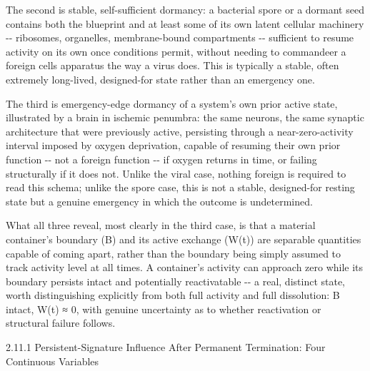 \documentclass[
]{article}
\begin{document}
The second is stable, self-sufficient dormancy: a bacterial spore or a
dormant seed contains both the blueprint and at least some of its own
latent cellular machinery -\/- ribosomes, organelles, membrane-bound
compartments -\/- sufficient to resume activity on its own once
conditions permit, without needing to commandeer a foreign cells
apparatus the way a virus does. This is typically a stable, often
extremely long-lived, designed-for state rather than an emergency one.

The third is emergency-edge dormancy of a system's own prior active
state, illustrated by a brain in ischemic penumbra: the same neurons,
the same synaptic architecture that were previously active, persisting
through a near-zero-activity interval imposed by oxygen deprivation,
capable of resuming their own prior function -\/- not a foreign function
-\/- if oxygen returns in time, or failing structurally if it does not.
Unlike the viral case, nothing foreign is required to read this schema;
unlike the spore case, this is not a stable, designed-for resting state
but a genuine emergency in which the outcome is undetermined.

What all three reveal, most clearly in the third case, is that a
material container's boundary (B) and its active exchange (W(t)) are
separable quantities capable of coming apart, rather than the boundary
being simply assumed to track activity level at all times. A container's
activity can approach zero while its boundary persists intact and
potentially reactivatable -\/- a real, distinct state, worth
distinguishing explicitly from both full activity and full dissolution:
B intact, W(t) ≈ 0, with genuine uncertainty as to whether reactivation
or structural failure follows.

2.11.1 Persistent-Signature Influence After Permanent Termination: Four
Continuous Variables
\end{document}
